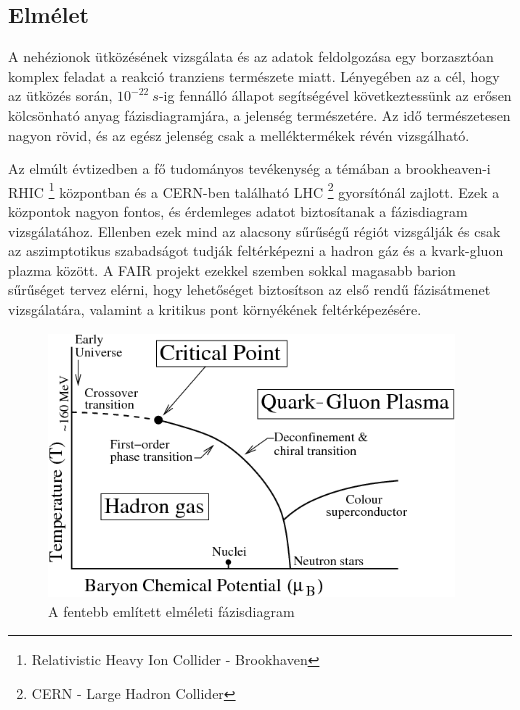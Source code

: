 \documentclass[a4paper,12pt]{article}
\begin{document}
\subsection{ Elmélet}
\vspace{5mm}
\par A nehézionok ütközésének vizsgálata és az adatok feldolgozása egy borzasztóan komplex feladat a reakció tranziens természete miatt. 
Lényegében az a cél, hogy az ütközés során, $10^{-22}~s$-ig fennálló állapot segítségével következtessünk az erősen kölcsönható anyag 
fázisdiagramjára, a jelenség természetére. Az idő természetesen nagyon rövid, és az egész jelenség csak a melléktermékek révén vizsgálható. 
\par  Az elmúlt évtizedben a fő tudományos tevékenység a témában a brookheaven-i RHIC  \footnote{ Relativistic Heavy Ion Collider - Brookhaven } központban 
és a CERN-ben található LHC \footnote{ CERN - Large Hadron Collider } gyorsítónál zajlott. Ezek a központok nagyon fontos, és érdemleges 
adatot biztosítanak a fázisdiagram vizsgálatához. Ellenben ezek mind az alacsony sűrűségű régiót vizsgálják és csak az aszimptotikus szabadságot tudják
feltérképezni a hadron gáz és a kvark-gluon plazma között. A FAIR projekt ezekkel szemben sokkal magasabb barion sűrűséget tervez elérni, hogy 
lehetőséget biztosítson az első rendű fázisátmenet vizsgálatára, valamint a kritikus pont környékének feltérképezésére. 
\begin{figure}[H]
	\centering
	\includegraphics[width=0.96\textwidth]{CBM_phase_trans.png}
	\caption{ A fentebb említett elméleti fázisdiagram  }
\end{figure}
\end{document}
